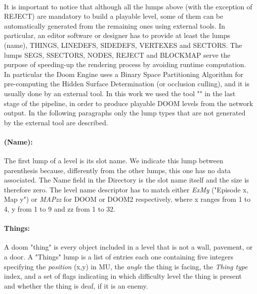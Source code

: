 \paragraph{} It is important to notice that although all the lumps above (with the exception of REJECT) are mandatory to build a playable level, some of them can be automatically generated from the remaining ones using external tools. In particular, an editor software or designer has to provide at least the lumps (name), THINGS, LINEDEFS, SIDEDEFS, VERTEXES and SECTORS. The lumps SEGS, SSECTORS, NODES, REJECT and BLOCKMAP serve the purpose of speeding-up the rendering process by avoiding runtime computation. In particular the Doom Engine uses a Binary Space Partitioning Algorithm \cite{Fuchs:1980:VSG:965105.807481} for pre-computing the Hidden Surface Determination (or occlusion culling), and it is usually done by an external tool. In this work we used the tool "" \cite{bsp} in the last stage of the pipeline, in order to produce playable DOOM levels from the network output. In the following paragraphs only the lump types that are not generated by the external tool are described.

\paragraph{(Name):} \label{slotname} The first lump of a level is its slot name. We indicate this lump between parenthesis because, differently from the other lumps, this one has no data associated. The Name field in the Directory is the slot name itself and the size is therefore zero. The level name descriptor has to match either \textit{ExMy} ("Episode x, Map y") or \textit{MAPzz} for DOOM or DOOM2 respectively, where x ranges from 1 to 4, y from 1 to 9 and zz from 1 to 32.


\paragraph{Things:} A doom "\gls{thing}" is every object included in a level that is not a wall, pavement, or a door. A "Things" lump is a list of entries each one containing five integers specifying the \textit{position} (x,y) in \gls{MU}, the \textit{angle} the thing is facing, the \textit{Thing type} index, and a set of flags indicating in which difficulty level the thing is present and whether the thing is deaf, if it is an enemy.

